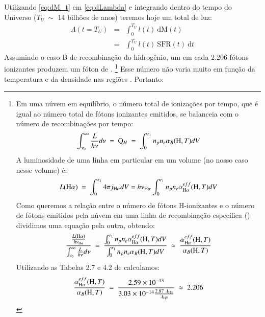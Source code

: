 Utilizando \eqref{eq:dM_t} em \eqref{eq:dLambda} e integrando dentro do tempo do Universo ($T_U\ \sim$ 14 bilhões de anos) teremos hoje um total de luz:
\begin{eqnarray}
	\Lambda(t = T_U) &=& \int_0^{T_U} l(t)\ \textrm{d}\textrm{M}(t) \\
	&=& \int_0^{T_U} l(t)\ \mathrm{SFR}(t)\  \textrm{d}t
	\label{eq:Lambda}
\end{eqnarray}
\noindent Assumindo o caso B de recombinação do hidrogênio, um em cada 2.206 fótons ionizantes produzem um fóton de \Ha \citep{Osterbrock.Ferland.2006a}.
\footnote{
Em uma núvem em equilíbrio, o número total de ionizações por tempo, que é igual ao número total de fótons ionizantes emitidos, se balanceia com o número de recombinações por tempo:
\begin{eqnarray}
		\int_{\nu_0}^{\infty} \frac{L}{h\nu} d \nu\ =\ \mathrm{Q}_H\ =\ \int_0^{r_1} n_p n_e \alpha_B({\rm H}, T) dV
\end{eqnarray}
A luminosidade de uma linha em particular em um volume (no nosso caso \Ha nesse volume) é:
\begin{eqnarray}
	L(\Ha)\ =\ \int_0^{r_1} 4 \pi j_{\Ha} dV = h \nu_{\Ha} \int_0^{r_1} n_p n_e \alpha_{\Ha}^{eff}({\rm H}, T) dV
\end{eqnarray}
Como queremos a relação entre o número de fótons H-ionizantes e o número de fótons emitidos pela núvem em uma linha de recombinação específica (\Ha) dividimos uma equação pela outra, obtendo:
\begin{eqnarray}
	\frac{\frac{L(\Ha)}{h \nu_{\Ha}}}{\int_{\nu_0}^{\infty} \frac{L}{h\nu} d \nu}\ =\ \frac{\int_0^{r_1} n_p n_e \alpha_{\Ha}^{eff}({\rm H}, T) dV}{\int_0^{r_1} n_p n_e \alpha_B({\rm H}, T) dV}\ \approx\ \frac{\alpha_{\Ha}^{eff}({\rm H}, T)}{\alpha_B({\rm H}, T)}
\end{eqnarray}
Utilizando as Tabelas 2.7 e 4.2 de \citet{Osterbrock.Ferland.2006a} calculamos:
\begin{eqnarray}
	\frac{\alpha_{\Ha}^{eff}({\rm H}, T)}{\alpha_B({\rm H}, T)}\ =\ \frac{2.59\times10^{-13}}{3.03\times10^{-14} \frac{2.87\ \lambda_{\Ha}}{\lambda_{\Hb}}}\ \approx\ 2.206
\end{eqnarray}
}
{
}
 Esse número não varia muito em função da temperatura e da densidade nas regiões \Hii. Portanto:
